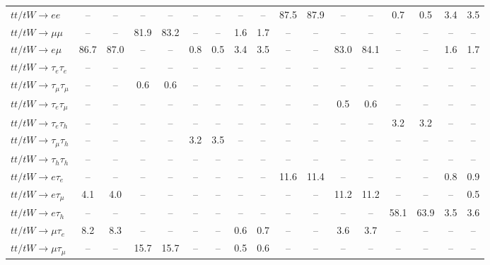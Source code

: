 \begin{sidewaystable}[p]
\begin{tabular}{|l|cc|cc|cc|cc|cc|cc|cc|cc|}
    $tt/tW \to ee$                     &   -- &   -- &   -- &   -- &   -- &   -- &   -- &   -- & 87.5 & 87.9 &   -- &   -- &  0.7 &  0.5 &  3.4 &  3.5 \\ 
    $tt/tW \to \mu\mu$                 &   -- &   -- & 81.9 & 83.2 &   -- &   -- &  1.6 &  1.7 &   -- &   -- &   -- &   -- &   -- &   -- &   -- &   -- \\ 
    $tt/tW \to e\mu$                   & 86.7 & 87.0 &   -- &   -- &  0.8 &  0.5 &  3.4 &  3.5 &   -- &   -- & 83.0 & 84.1 &   -- &   -- &  1.6 &  1.7 \\ 
    $tt/tW \to \tau_{e}\tau_{e}$       &   -- &   -- &   -- &   -- &   -- &   -- &   -- &   -- &   -- &   -- &   -- &   -- &   -- &   -- &   -- &   -- \\ 
    $tt/tW \to \tau_{\mu}\tau_{\mu}$   &   -- &   -- &  0.6 &  0.6 &   -- &   -- &   -- &   -- &   -- &   -- &   -- &   -- &   -- &   -- &   -- &   -- \\ 
    $tt/tW \to \tau_{e}\tau_{\mu}$     &   -- &   -- &   -- &   -- &   -- &   -- &   -- &   -- &   -- &   -- &  0.5 &  0.6 &   -- &   -- &   -- &   -- \\ 
    $tt/tW \to \tau_{e}\tau_{h}$       &   -- &   -- &   -- &   -- &   -- &   -- &   -- &   -- &   -- &   -- &   -- &   -- &  3.2 &  3.2 &   -- &   -- \\ 
    $tt/tW \to \tau_{\mu}\tau_{h}$     &   -- &   -- &   -- &   -- &  3.2 &  3.5 &   -- &   -- &   -- &   -- &   -- &   -- &   -- &   -- &   -- &   -- \\ 
    $tt/tW \to \tau_{h}\tau_{h}$       &   -- &   -- &   -- &   -- &   -- &   -- &   -- &   -- &   -- &   -- &   -- &   -- &   -- &   -- &   -- &   -- \\ 
    $tt/tW \to e\tau_{e}$              &   -- &   -- &   -- &   -- &   -- &   -- &   -- &   -- & 11.6 & 11.4 &   -- &   -- &   -- &   -- &  0.8 &  0.9 \\ 
    $tt/tW \to e\tau_{\mu}$            &  4.1 &  4.0 &   -- &   -- &   -- &   -- &   -- &   -- &   -- &   -- & 11.2 & 11.2 &   -- &   -- &   -- &  0.5 \\ 
    $tt/tW \to e\tau_{h}$              &   -- &   -- &   -- &   -- &   -- &   -- &   -- &   -- &   -- &   -- &   -- &   -- & 58.1 & 63.9 &  3.5 &  3.6 \\ 
    $tt/tW \to \mu\tau_{e}$            &  8.2 &  8.3 &   -- &   -- &   -- &   -- &  0.6 &  0.7 &   -- &   -- &  3.6 &  3.7 &   -- &   -- &   -- &   -- \\ 
    $tt/tW \to \mu\tau_{\mu}$          &   -- &   -- & 15.7 & 15.7 &   -- &   -- &  0.5 &  0.6 &   -- &   -- &   -- &   -- &   -- &   -- &   -- &   -- \\ 

\end{tabular}
\end{sidewaystable}
